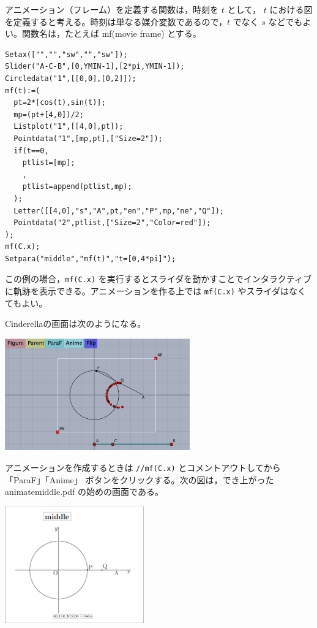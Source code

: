 \documentclass[papersize,a4paper,12pt,uplatex]{jsarticle}
\begin{document}
アニメーション（フレーム）を定義する関数は，時刻を $t$ として， $t$ における図を定義すると考える。時刻は単なる媒介変数であるので，$t$ でなく $s$ などでもよい。関数名は，たとえば mf(movie frame) とする。

\begin{verbatim}
Setax(["","","sw","","sw"]);
Slider("A-C-B",[0,YMIN-1],[2*pi,YMIN-1]);
Circledata("1",[[0,0],[0,2]]);
mf(t):=(
  pt=2*[cos(t),sin(t)];
  mp=(pt+[4,0])/2;
  Listplot("1",[[4,0],pt]);
  Pointdata("1",[mp,pt],["Size=2"]);
  if(t==0,
    ptlist=[mp];
    ,
    ptlist=append(ptlist,mp);
  );
  Letter([[4,0],"s","A",pt,"en","P",mp,"ne","Q"]);
  Pointdata("2",ptlist,["Size=2","Color=red"]);
);
mf(C.x);
Setpara("middle","mf(t)","t=[0,4*pi]");
\end{verbatim}

この例の場合，\verb|mf(C.x)| を実行するとスライダを動かすことでインタラクティブに軌跡を表示できる。アニメーションを作る上では \verb|mf(C.x)| やスライダはなくてもよい。

Cinderellaの画面は次のようになる。

\vspace{\baselineskip}
\hspace{20mm} \includegraphics[bb=0.00 0.00 608.03 367.02,width=8cm]{Fig/moviedata01.pdf}

アニメーションを作成するときは \verb|//mf(C.x)| とコメントアウトしてから 「ParaF」「Anime」 ボタンをクリックする。次の図は，でき上がった animatemiddle.pdf の始めの画面である。

\hspace{30mm}\includegraphics[bb=0.00 0.00 470.02 394.02,width=6cm]{Fig/moviedata02.pdf}
\end{document}

